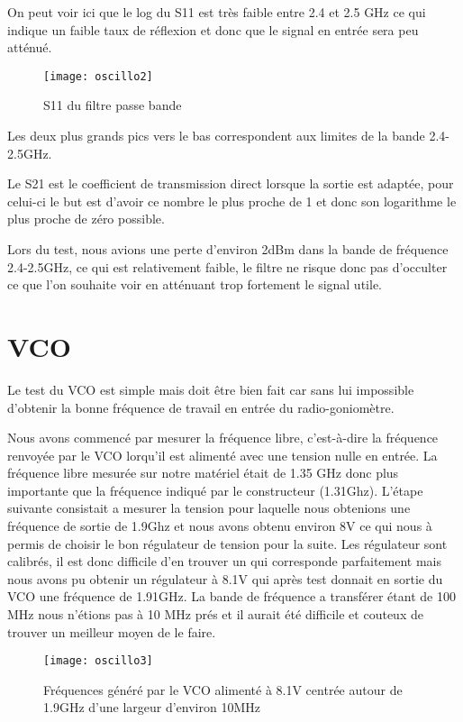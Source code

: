 On peut voir ici que le log du S11 est très faible entre 2.4 et 2.5 GHz ce qui indique un faible taux de réflexion et donc que le signal en entrée sera peu atténué.

\begin{figure}[h]
  \centering
  \texttt{[image: oscillo2]}
  \caption{S11 du filtre passe bande}
  \label{fig:filtre}
\end{figure}


Les deux plus grands pics vers le bas correspondent aux limites de la bande 2.4-2.5GHz.

Le S21 est le coefficient de transmission direct lorsque la sortie est adaptée, pour celui-ci le but est d’avoir ce nombre le plus proche de 1 et donc son logarithme le plus proche de zéro possible.

Lors du test, nous avions une perte d’environ 2dBm dans la bande de fréquence 2.4-2.5GHz, ce qui est relativement faible, le filtre ne risque donc pas d’occulter ce que l’on souhaite voir en atténuant trop fortement le signal utile.
\newpage
\section{VCO}



Le test du VCO est simple mais doit être bien fait car sans lui impossible d’obtenir la bonne fréquence de travail en entrée du radio-goniomètre.

Nous avons commencé par mesurer la fréquence libre, c’est-à-dire la fréquence renvoyée par le VCO lorqu'il est alimenté avec une tension nulle en entrée. La fréquence libre mesurée sur notre matériel était de 1.35 GHz donc plus importante que la fréquence indiqué par le constructeur (1.31Ghz). L'étape suivante consistait a mesurer la tension pour laquelle nous obtenions une fréquence de sortie de 1.9Ghz et nous avons obtenu environ 8V ce qui nous à permis de choisir le bon régulateur de tension pour la suite.
 Les régulateur sont calibrés, il est donc difficile d’en trouver un qui corresponde parfaitement mais nous avons pu obtenir un régulateur à 8.1V qui après test donnait en sortie du VCO une fréquence de 1.91GHz. La bande de fréquence a transférer étant de 100 MHz nous n’étions pas à 10 MHz prés et il aurait été difficile et couteux de trouver un meilleur moyen de le faire.


\begin{figure}[h]
  \centering
  \texttt{[image: oscillo3]}
  \caption{Fréquences généré par le VCO alimenté à 8.1V centrée autour de 1.9GHz d’une largeur d’environ 10MHz}
  \label{fig:freq}
\end{figure}
\newpage
